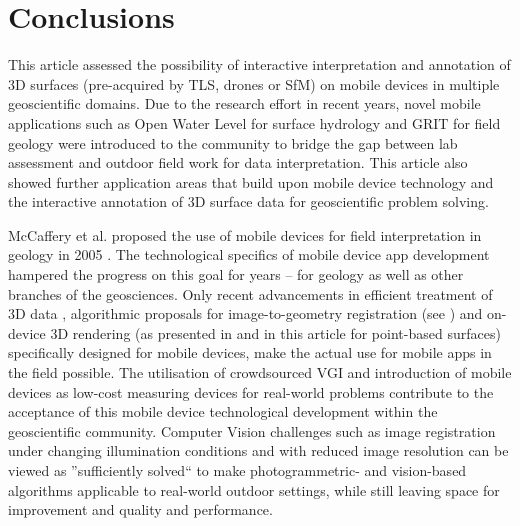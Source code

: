 \documentclass[review]{elsarticle}
\begin{document}
%


\section{Conclusions}
\label{sec:conclusions}

This article assessed the possibility of interactive interpretation and annotation of 3D surfaces (pre-acquired by \gls{TLS}, drones or \gls{SfM}) on mobile devices in multiple geoscientific domains. Due to the research effort in recent years, novel mobile applications such as Open Water Level for surface hydrology and \gls{GRIT} for field geology were introduced to the community to bridge the gap between lab assessment and outdoor field work for data interpretation. This article also showed further application areas that build upon mobile device technology and the interactive annotation of 3D surface data for geoscientific problem solving.

McCaffery et al. proposed the use of mobile devices for field interpretation in geology in 2005 \cite{McCaffrey2005}. The technological specifics of mobile device app development hampered the progress on this goal for years -- for geology as well as other branches of the geosciences. Only recent advancements in efficient treatment of 3D data \cite{Kroehnert2017b}, algorithmic proposals for image-to-geometry registration (see \citep{Gauglitz2014,Kehl2017_VGC}) and on-device 3D rendering (as presented in \cite{Agus2017} and in this article for point-based surfaces) specifically designed for mobile devices, make the actual use for mobile apps in the field possible. The utilisation of crowdsourced \gls{VGI} and introduction of mobile devices as low-cost measuring devices for real-world problems \cite{Eltner2017} contribute to the acceptance of this mobile device technological development within the geoscientific community. Computer Vision challenges such as image registration under changing illumination conditions and with reduced image resolution can be viewed as ''sufficiently solved`` to make photogrammetric- and vision-based algorithms applicable to real-world outdoor settings, while still leaving space for improvement and quality and performance.
\end{document}
